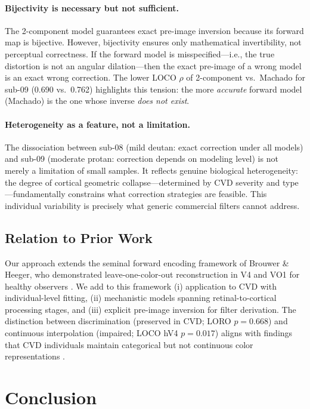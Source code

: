 \documentclass{article}
\begin{document}
\paragraph{Bijectivity is necessary but not sufficient.}
The 2-component model guarantees exact pre-image inversion because its forward map is bijective.
However, bijectivity ensures only mathematical invertibility, not perceptual correctness.
If the forward model is misspecified---i.e., the true distortion is not an angular dilation---then the exact pre-image of a wrong model is an exact wrong correction.
The lower LOCO $\rho$ of 2-component vs.\ Machado for sub-09 (0.690 vs.\ 0.762) highlights this tension: the more \emph{accurate} forward model (Machado) is the one whose inverse \emph{does not exist}.

\paragraph{Heterogeneity as a feature, not a limitation.}
The dissociation between sub-08 (mild deutan: exact correction under all models) and sub-09 (moderate protan: correction depends on modeling level) is not merely a limitation of small samples.
It reflects genuine biological heterogeneity: the degree of cortical geometric collapse---determined by CVD severity and type---fundamentally constrains what correction strategies are feasible.
This individual variability is precisely what generic commercial filters cannot address.

\subsection{Relation to Prior Work}

Our approach extends the seminal forward encoding framework of Brouwer \& Heeger, who demonstrated leave-one-color-out reconstruction in V4 and VO1 for healthy observers \cite{placeholder_brouwer2009}.
We add to this framework (i) application to CVD with individual-level fitting, (ii) mechanistic models spanning retinal-to-cortical processing stages, and (iii) explicit pre-image inversion for filter derivation.
The distinction between discrimination (preserved in CVD; LORO $p = 0.668$) and continuous interpolation (impaired; LOCO hV4 $p = 0.017$) aligns with findings that CVD individuals maintain categorical but not continuous color representations \cite{placeholder_bannert2018}.

\section{Conclusion}
\label{sec:conclusion}
\end{document}
